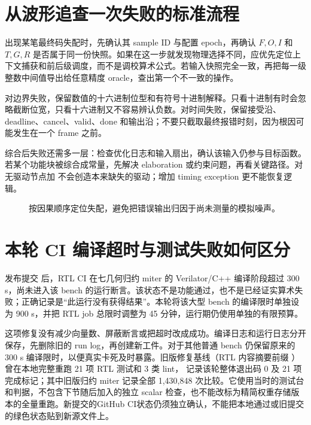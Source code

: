 \section{从波形追查一次失败的标准流程}
出现某笔最终码失配时，先确认其 sample ID 与配置 epoch，再确认 \(F,O,I\) 和 \(T,G,R\) 是否属于同一份快照。如果在这一步就发现物理选择不同，应优先定位上下文捕获和前后级调度，而不是调校算术公式。若输入快照完全一致，再把每一级整数中间值导出给任意精度 oracle，查出第一个不一致的操作。

对边界失败，保留数值的十六进制位型和有符号十进制解释。只看十进制有时会忽略截断位宽，只看十六进制又不容易辨认负数。对时间失败，保留接受沿、deadline、cancel、valid、done 和输出沿；不要只截取最终报错时刻，因为根因可能发生在一个 frame 之前。

综合后失败还需多一层：检查优化日志和输入扇出，确认该输入仍参与目标函数。若某个功能块被综合成常量，先解决 elaboration 或约束问题，再看关键路径。对无驱动节点加  不会创造本来缺失的驱动；增加 timing exception 更不能恢复逻辑。

\begin{figure}[htbp]\centering
{}
\caption{按因果顺序定位失配，避免把错误输出归因于尚未测量的模拟噪声。}
\end{figure}

\section{本轮 CI 编译超时与测试失败如何区分}
发布提交  后，RTL CI 在七几何归约 miter 的 Verilator/C++ 编译阶段超过 300 s，尚未进入该 bench 的运行断言。该状态不是功能通过，也不是已经证实算术失败；正确记录是“此运行没有获得结果”。本轮将该大型 bench 的编译限时单独设为 900 s，并把 RTL job 总限时调整为 45 分钟，运行期仍使用单独的有限预算。

这项修复没有减少向量数、屏蔽断言或把超时改成成功。编译日志和运行日志分开保存，先删除旧的 run log，再创建新工件。对于其他普通 bench 仍保留原来的 300 s 编译限时，以便真实卡死及时暴露。旧版修复基线（RTL 内容摘要前缀 ）曾在本地完整重跑 21 项 RTL 测试和 3 类 lint， 记录该轮整体退出码 0 及 21 项完成标记；其中旧版归约 miter 记录全部 1,430,848 次比较。它使用当时的测试台和判据，不包含下节随后加入的独立 scalar 检查，也不能改标为精简权重存储版本的全量重跑。新提交的GitHub CI状态仍须独立确认，不能把本地通过或旧提交的绿色状态贴到新源文件上。

